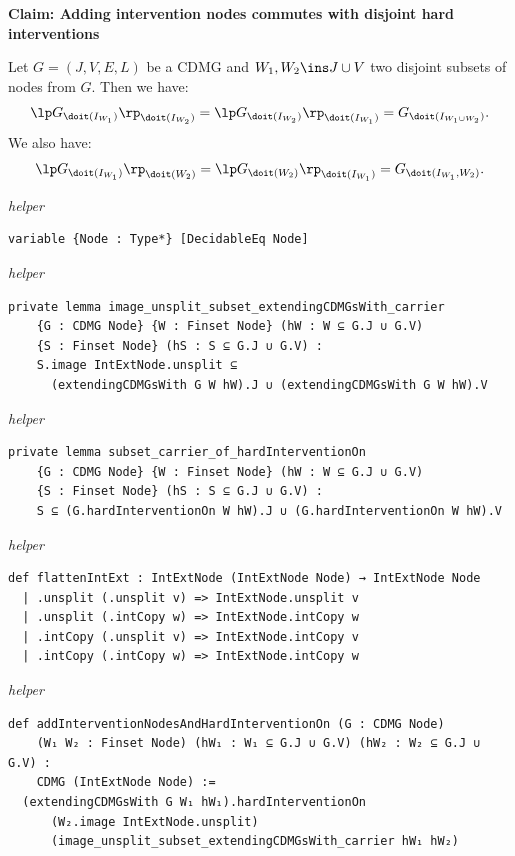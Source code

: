 \vspace{\appendixNotesGap}

\noindent\textbf{Claim: Adding intervention nodes commutes with disjoint hard interventions}\par\smallskip
{\appendixTexSize
    Let $G=(J,V,E,L)$ be a CDMG and $W_1, W_2 \ins J \cup V$ two disjoint subsets of nodes from $G$.
      Then we have:
      \[ \lp G_{\doit(I_{W_1})} \rp_{\doit(I_{W_2})} = \lp G_{\doit(I_{W_2})} \rp_{\doit(I_{W_1})} 
      =  G_{\doit(I_{W_1 \cup W_2})}. \]
      We also have:
      \[ \lp G_{\doit(I_{W_1})} \rp_{\doit(W_2)} = \lp G_{\doit(W_2)} \rp_{\doit(I_{W_1})} =  G_{\doit(I_{W_1}, W_2)}. \]
\par}
\smallskip
{\small\textit{helper}}
\begin{verbatim}
variable {Node : Type*} [DecidableEq Node]
\end{verbatim}
{\small\textit{helper}}
\begin{verbatim}
private lemma image_unsplit_subset_extendingCDMGsWith_carrier
    {G : CDMG Node} {W : Finset Node} (hW : W ⊆ G.J ∪ G.V)
    {S : Finset Node} (hS : S ⊆ G.J ∪ G.V) :
    S.image IntExtNode.unsplit ⊆
      (extendingCDMGsWith G W hW).J ∪ (extendingCDMGsWith G W hW).V
\end{verbatim}
{\small\textit{helper}}
\begin{verbatim}
private lemma subset_carrier_of_hardInterventionOn
    {G : CDMG Node} {W : Finset Node} (hW : W ⊆ G.J ∪ G.V)
    {S : Finset Node} (hS : S ⊆ G.J ∪ G.V) :
    S ⊆ (G.hardInterventionOn W hW).J ∪ (G.hardInterventionOn W hW).V
\end{verbatim}
{\small\textit{helper}}
\begin{verbatim}
def flattenIntExt : IntExtNode (IntExtNode Node) → IntExtNode Node
  | .unsplit (.unsplit v) => IntExtNode.unsplit v
  | .unsplit (.intCopy w) => IntExtNode.intCopy w
  | .intCopy (.unsplit v) => IntExtNode.intCopy v
  | .intCopy (.intCopy w) => IntExtNode.intCopy w
\end{verbatim}
{\small\textit{helper}}
\begin{verbatim}
def addInterventionNodesAndHardInterventionOn (G : CDMG Node)
    (W₁ W₂ : Finset Node) (hW₁ : W₁ ⊆ G.J ∪ G.V) (hW₂ : W₂ ⊆ G.J ∪ G.V) :
    CDMG (IntExtNode Node) :=
  (extendingCDMGsWith G W₁ hW₁).hardInterventionOn
      (W₂.image IntExtNode.unsplit)
      (image_unsplit_subset_extendingCDMGsWith_carrier hW₁ hW₂)
\end{verbatim}
